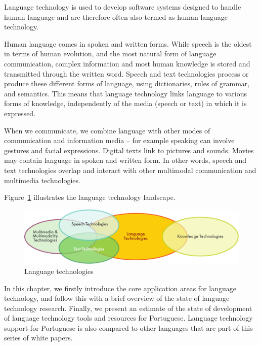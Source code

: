 \clearpage


\begin{multicols}{2}

Language technology is used to develop software systems designed to handle human language and are therefore often also termed as human language technology. 

Human language comes in spoken and written forms. 
While speech is the oldest  in terms of human evolution, and the most natural form of language communication, 
complex information and most human knowledge is stored and transmitted through the written word. 
Speech and text technologies process or produce these different forms of language, using dictionaries, rules of grammar, and semantics. 
This means that language technology links language to various forms of knowledge, independently of the media (speech or text) in which it is expressed. 

When we communicate, we combine language with other modes of communication and information media -- for example speaking 
can involve gestures and facial expressions. Digital texts link to pictures and sounds. 
Movies may contain language in spoken and written form. In other words, speech and text technologies overlap 
and interact with other multimodal communication and multimedia technologies.

Figure~\ref{fig:ltincontext_en} illustrates the language technology landscape.

\begin{figure}[htb]
  \center
  \includegraphics[width=\textwidth]{../_media/english/language_technologies}
  \caption{Language technologies}
  \label{fig:ltincontext_en}
\end{figure}

In this chapter, we firstly introduce the core application areas for language technology, and follow this with a brief overview of the state of language technology research. Finally, we present an estimate of the state of development of language technology tools and resources for Portuguese. 
Language technology support for Portuguese is also compared to other languages that are part of this series of white papers.



\end{multicols}
